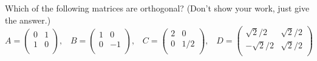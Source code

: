 \documentclass[11pt]{article}
\begin{document}
Which of the following matrices are orthogonal?
(Don't show your work, just give the answer.)
$$
   A =
   \left(
   \begin{array}{cc}
    0 & 1 \\ 	
    1 & 0 \\ 
   \end{array} \right), 
   \hspace{10pt}
   B =
   \left(
   \begin{array}{cc}
    1 & 0 \\ 	
    0 & -1 \\ 
   \end{array} \right), 
   \hspace{10pt}
   C =
   \left(
   \begin{array}{cc}
    2 & 0 \\ 	
    0 & 1/2 \\ 
   \end{array} \right), 
   \hspace{10pt}
   D =
   \left(
   \begin{array}{cc}
    \sqrt 2 / 2 & \sqrt 2 / 2 \\ 	
    -\sqrt 2 / 2 & \sqrt 2 / 2 \\ 	
   \end{array} \right)
$$
\end{document}
